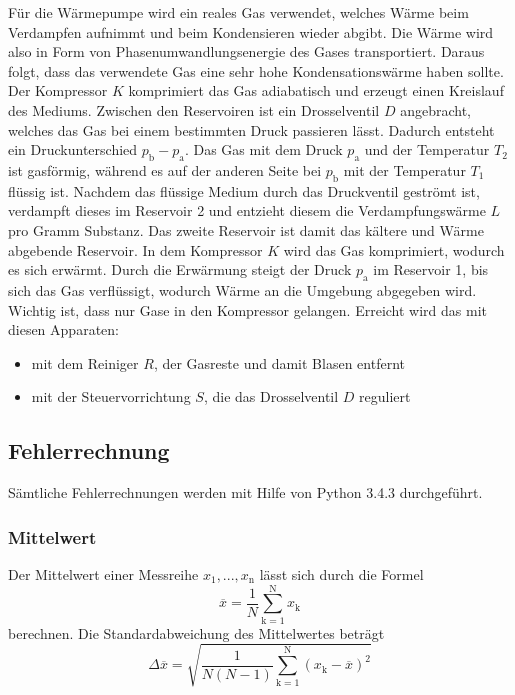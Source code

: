 Für die Wärmepumpe wird ein reales Gas verwendet, welches Wärme beim Verdampfen aufnimmt und beim Kondensieren wieder abgibt. Die Wärme wird also in Form von Phasenumwandlungsenergie des Gases transportiert. Daraus folgt, dass das verwendete Gas eine sehr hohe Kondensationswärme haben sollte. Der Kompressor $K$ komprimiert das Gas adiabatisch und erzeugt einen Kreislauf des Mediums. Zwischen den Reservoiren ist ein Drosselventil $D$ angebracht, welches das Gas bei einem bestimmten Druck passieren lässt. Dadurch entsteht ein Druckunterschied $p_\text{b} - p_\text{a}$. Das Gas mit dem Druck $p_\text{a}$ und der Temperatur $T_\text{2}$ ist gasförmig, während es auf der anderen Seite bei $p_\text{b}$ mit der Temperatur $T_\text{1}$ flüssig ist. Nachdem das flüssige Medium durch das Druckventil geströmt ist, verdampft dieses im Reservoir 2 und entzieht diesem die Verdampfungswärme $L$ pro Gramm Substanz. Das zweite Reservoir ist damit das kältere und Wärme abgebende Reservoir. In dem Kompressor $K$ wird das Gas komprimiert, wodurch es sich erwärmt. Durch die Erwärmung steigt der Druck $p_\text{a}$ im Reservoir 1, bis sich das Gas verflüssigt, wodurch Wärme an die Umgebung abgegeben wird. \\
Wichtig ist, dass nur Gase in den Kompressor gelangen. Erreicht wird das mit diesen Apparaten:
\begin{itemize}
\item mit dem Reiniger $R$, der Gasreste und damit Blasen entfernt
\item mit der Steuervorrichtung $S$, die das Drosselventil $D$ reguliert
\end{itemize}

\subsection{Fehlerrechnung}
Sämtliche Fehlerrechnungen werden mit Hilfe von Python 3.4.3 durchgeführt.
\subsubsection{Mittelwert}
Der Mittelwert einer Messreihe $x_\text{1}, ... ,x_\text{n}$ lässt sich durch die Formel
\begin{equation}
	\overline{x} = \frac{1}{N} \sum_{\text{k}=1}^\text{N} x_\text{k}
	\label{eqn:ave}
\end{equation}
berechnen. Die Standardabweichung des Mittelwertes beträgt
\begin{equation}
	\Delta \overline{x} = \sqrt{ \frac{1}{N(N-1)} \sum_{\text{k}=1}^\text{N} (x_\text{k} - \overline{x})^2}
	\label{eqn:var}
\end{equation}

